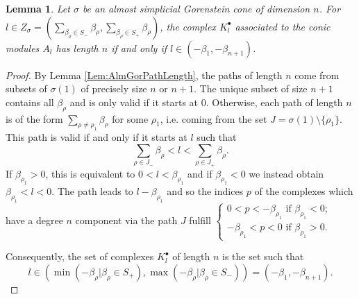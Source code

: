 \documentclass[reqno, 12pt]{amsart}
\newtheorem{lemma}[theorem]{Lemma}
\theoremstyle{definition}
\numberwithin{equation}{section}
\begin{document}
\begin{lemma}
\label{Lem:AlmGorFullLength}
Let $\sigma$ be an almost simplicial Gorenstein cone of dimension $n$. For $l\in Z_\sigma= (\sum_{\beta_\rho\in S_-}\beta_\rho,\sum_{\beta_\rho\in S_+}\beta_\rho)$, the complex $K_l^\bullet$ associated to the conic modules $A_l$ has length $n$ if and only if $l\in (-\beta_1,-\beta_{n+1})$.
\end{lemma}
\begin{proof}
    By Lemma \ref{Lem:AlmGorPathLength}, the paths of length $n$ come from subsets of $\sigma(1)$ of precisely size $n$ or $n+1$. The unique subset of size $n+1$ contains all $\beta_\rho$ and is only valid if it starts at 0. Otherwise, each path of length $n$ is of the form $\sum_{\rho\neq \rho_1}\beta_\rho$ for some $\rho_1$, i.e. coming from the set $J=\sigma(1)\setminus\{\rho_1\}$. This path is valid if and only if it starts at $l$ such that \[
    \sum_{\rho\in J_-}\beta_\rho<l<\sum_{\rho\in J_+}\beta_\rho.
    \]
    If $\beta_{\rho_1}>0$, this is equivalent to $0<l<\beta_{\rho_1}$ and if $\beta_{\rho_1}<0$ we instead obtain $\beta_{\rho_1}<l<0$. The path leads to $l-\beta_{\rho_1}$ and so the indices $p$ of the complexes which have a degree $n$ component  via the path $J$ fulfill $\begin{cases}
        0<p<-\beta_{\rho_1} \text{ if }\beta_{\rho_1}<0;\\
       -\beta_{\rho_1}<p<0 \text{ if }\beta_{\rho_1}>0.
    \end{cases}$
    
    Consequently, the set of complexes $K_l^\bullet$ of length $n$ is the set such that \[l\in \left(\min(-\beta_\rho\vert \beta_\rho\in S_+),\max(-\beta_\rho\vert\beta_\rho\in S_-)\right)=(-\beta_1,-\beta_{n+1}).\]
\end{proof}
\end{document}
